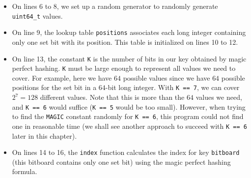 \documentclass[12pt,a4paper,twoside,openright]{book}
\begin{document}
\begin{itemize}

\item On lines 6 to 8, we set up a random generator to randomly generate \texttt{uint64_t} values.

\item On line 9, the lookup table \texttt{positions} associates each long integer containing only one set bit with its position. This table is initialized on lines 10 to 12.

\item On line 13, the constant \texttt{K} is the number of bits in our key obtained by magic perfect hashing. \texttt{K} must be large enough to represent all values we need to cover. For example, here we have $64$ possible values since we have $64$ possible positions for the set bit in a $64$-bit long integer. With \texttt{K == 7}, we can cover $2^7 = 128$ different values. Note that this is more than the $64$ values we need, and \texttt{K == 6} would suffice (\texttt{K == 5} would be too small). However, when trying to find the \texttt{MAGIC} constant randomly for \texttt{K == 6}, this program could not find one in reasonable time (we shall see another approach to succeed with \texttt{K == 6} later in this chapter).

\item On lines 14 to 16, the \texttt{index} function calculates the index for key \texttt{bitboard} (this bitboard contains only one set bit) using the magic perfect hashing formula.


\end{itemize}
\end{document}
